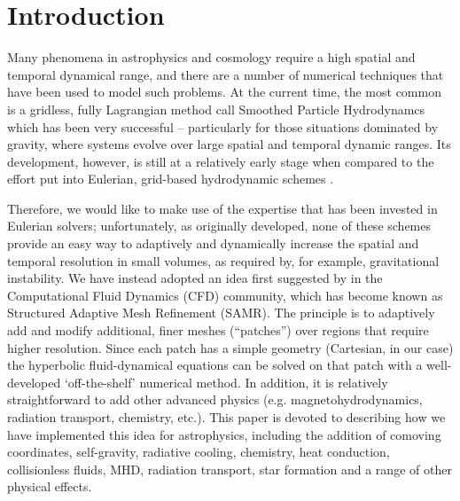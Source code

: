 
\section{Introduction}\label{sec.intro}


Many phenomena in astrophysics and cosmology require a high spatial and temporal dynamical range, and there are a number of numerical techniques that have been used to model such problems.  At the current time, the most common is a gridless, fully Lagrangian method call Smoothed Particle Hydrodynamcs \citep[SPH;][]{Lucy77, SPH} which has been very successful -- particularly for those situations dominated by gravity, where systems evolve over large spatial and temporal dynamic ranges.  Its development, however, is still at a relatively early stage when compared to the effort put into Eulerian, grid-based hydrodynamic schemes \citep[e.g.,][]{laney-1998, toro-1997, Woodward84}. 

Therefore, we would like to make use of the expertise that has been invested in Eulerian solvers; unfortunately, as originally developed, none of these schemes provide an easy way to adaptively and dynamically increase the spatial and temporal resolution in small volumes, as required by, for example, gravitational instability.  We have instead adopted an idea first suggested by \citet{Berger89} in the Computational Fluid Dynamics (CFD) community, which has become known as Structured Adaptive Mesh Refinement (SAMR).  The principle is to adaptively add and modify additional, finer meshes (``patches'') over regions that require higher resolution.  Since each patch has a simple geometry (Cartesian, in our case) the hyperbolic fluid-dynamical equations can be solved on that patch with a well-developed `off-the-shelf' numerical method.  In addition, it is relatively straightforward to add other advanced physics (e.g. magnetohydrodynamics, radiation transport, chemistry, etc.). This paper is devoted to describing how we have implemented this idea for astrophysics, including the addition of comoving coordinates, self-gravity, radiative cooling, chemistry, heat conduction, collisionless fluids, MHD, radiation transport, star formation and a range of other physical effects.

